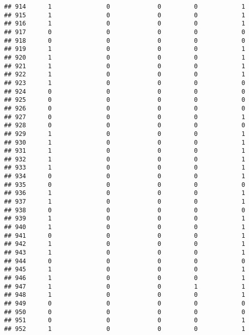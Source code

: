 \documentclass[]{article}
\begin{document}
\begin{verbatim}
## 914      1               0             0         0            1
## 915      1               0             0         0            1
## 916      1               0             0         0            1
## 917      0               0             0         0            0
## 918      0               0             0         0            0
## 919      1               0             0         0            1
## 920      1               0             0         0            1
## 921      1               0             0         0            1
## 922      1               0             0         0            1
## 923      1               0             0         0            0
## 924      0               0             0         0            0
## 925      0               0             0         0            0
## 926      0               0             0         0            0
## 927      0               0             0         0            1
## 928      0               0             0         0            0
## 929      1               0             0         0            1
## 930      1               0             0         0            1
## 931      1               0             0         0            1
## 932      1               0             0         0            1
## 933      1               0             0         0            1
## 934      0               0             0         0            1
## 935      0               0             0         0            0
## 936      1               0             0         0            1
## 937      1               0             0         0            1
## 938      0               0             0         0            0
## 939      1               0             0         0            1
## 940      1               0             0         0            1
## 941      0               0             0         0            1
## 942      1               0             0         0            1
## 943      1               0             0         0            1
## 944      0               0             0         0            0
## 945      1               0             0         0            1
## 946      1               0             0         0            1
## 947      1               0             0         1            1
## 948      1               0             0         0            1
## 949      0               0             0         0            0
## 950      0               0             0         0            0
## 951      0               0             0         0            1
## 952      1               0             0         0            1

\end{verbatim}
\end{document}

